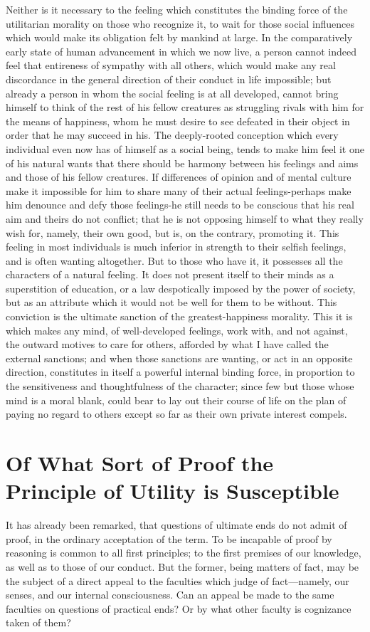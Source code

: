 \documentclass[12pt]{report}
\begin{document}
Neither is it necessary to the feeling which constitutes the binding force of the utilitarian morality on those who recognize it, to wait for those social influences which would make its obligation felt by mankind at large. In the comparatively early state of human advancement in which we now live, a person cannot indeed feel that entireness of sympathy with all others, which would make any real discordance in the general direction of their conduct in life impossible; but already a person in whom the social feeling is at all developed, cannot bring himself to think of the rest of his fellow creatures as struggling rivals with him for the means of happiness, whom he must desire to see defeated in their object in order that he may succeed in his. The deeply-rooted conception which every individual even now has of himself as a social being, tends to make him feel it one of his natural wants that there should be harmony between his feelings and aims and those of his fellow creatures. If differences of opinion and of mental culture make it impossible for him to share many of their actual feelings-perhaps make him denounce and defy those feelings-he still needs to be conscious that his real aim and theirs do not conflict; that he is not opposing himself to what they really wish for, namely, their own good, but is, on the contrary, promoting it. This feeling in most individuals is much inferior in strength to their selfish feelings, and is often wanting altogether. But to those who have it, it possesses all the characters of a natural feeling. It does not present itself to their minds as a superstition of education, or a law despotically imposed by the power of society, but as an attribute which it would not be well for them to be without. This conviction is the ultimate sanction of the greatest-happiness morality. This it is which makes any mind, of well-developed feelings, work with, and not against, the outward motives to care for others, afforded by what I have called the external sanctions; and when those sanctions are wanting, or act in an opposite direction, constitutes in itself a powerful internal binding force, in proportion to the sensitiveness and thoughtfulness of the character; since few but those whose mind is a moral blank, could bear to lay out their course of life on the plan of paying no regard to others except so far as their own private interest compels.
\chapter{Of What Sort of Proof the Principle of Utility is Susceptible}
It has already been remarked, that questions of ultimate ends do not admit of proof, in the ordinary acceptation of the term. To be incapable of proof by reasoning is common to all first principles; to the first premises of our knowledge, as well as to those of our conduct. But the former, being matters of fact, may be the subject of a direct appeal to the faculties which judge of fact—namely, our senses, and our internal consciousness. Can an appeal be made to the same faculties on questions of practical ends? Or by what other faculty is cognizance taken of them?
\end{document}
